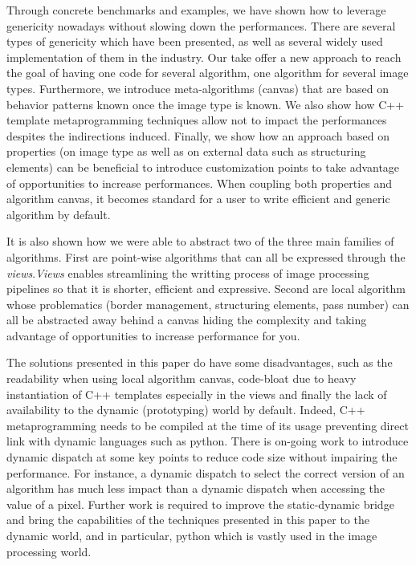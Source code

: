 Through concrete benchmarks and examples, we have shown how to leverage genericity nowadays without slowing down the
performances. There are several types of genericity which have been presented, as well as several widely used
implementation of them in the industry. Our take offer a new approach to reach the goal of having one code for several
algorithm, one algorithm for several image types. Furthermore, we introduce meta-algorithms (canvas) that are based on
behavior patterns known once the image type is known. We also show how C++ template metaprogramming techniques allow not
to impact the performances despites the indirections induced. Finally, we show how an approach based on properties (on
image type as well as on external data such as structuring elements) can be beneficial to introduce customization points
to take advantage of opportunities to increase performances. When coupling both properties and algorithm canvas, it
becomes standard for a user to write efficient and generic algorithm by default.

It is also shown how we were able to abstract two of the three main families of algorithms. First are point-wise
algorithms that can all be expressed through the \emph{views}.\emph{Views} enables streamlining the writting process of
image processing pipelines so that it is shorter, efficient and expressive. Second are local algorithm whose
problematics (border management, structuring elements, pass number) can all be abstracted away behind a canvas hiding
the complexity and taking advantage of opportunities to increase performance for you.

The solutions presented in this paper do have some disadvantages, such as the readability when using local algorithm
canvas, code-bloat due to heavy instantiation of C++ templates especially in the views and finally the lack of
availability to the dynamic (prototyping) world by default. Indeed, C++ metaprogramming needs to be compiled at the time
of its usage preventing direct link with dynamic languages such as python. There is on-going work to introduce dynamic
dispatch at some key points to reduce code size without impairing the performance. For instance, a dynamic dispatch to
select the correct version of an algorithm has much less impact than a dynamic dispatch when accessing the value of a
pixel. Further work is required to improve the static-dynamic bridge and bring the capabilities of the techniques
presented in this paper to the dynamic world, and in particular, python which is vastly used in the image processing
world.

